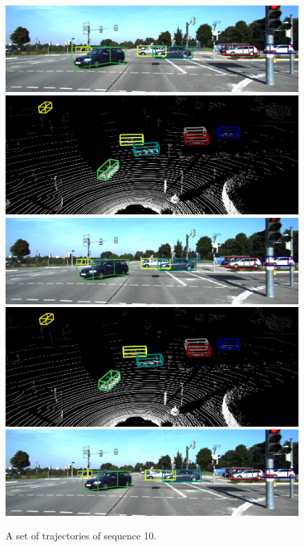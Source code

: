 \documentclass{bmvc2k}
\begin{document}
\begin{figure}
{\begin{minipage}[b]{0.45\linewidth}
			\includegraphics[width=1\linewidth]{images/supplementary/10/img/03.png}\vspace{3.55pt}
			\includegraphics[width=1\linewidth]{images/supplementary/10/pc/02.png}\vspace{1pt}
			\includegraphics[width=1\linewidth]{images/supplementary/10/img/02.png}\vspace{3.55pt}
			\includegraphics[width=1\linewidth]{images/supplementary/10/pc/01.png}\vspace{1pt}
			\includegraphics[width=1\linewidth]{images/supplementary/10/img/01.png}
	\end{minipage}}
	\caption{A set of trajectories of sequence 10.}
\end{figure}
\end{document}
